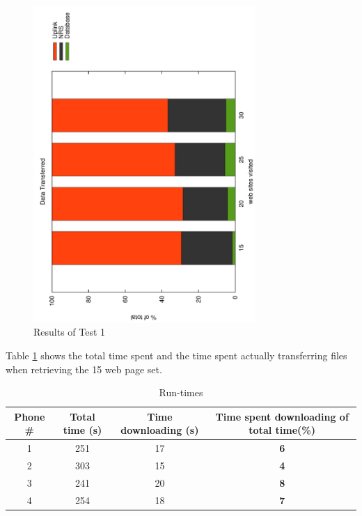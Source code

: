 \begin{figure}
	\centering
		\includegraphics[width=0.75\textwidth, angle=-90]{./img/plots.pdf}
    	\caption{Results of Test 1}
	\label{fig:frontendtest1}
\end{figure}

Table \ref{tbl:times} shows the total time spent and the time spent actually transferring files when retrieving the 15 web page set.

\begin{table}[!h]
		\centering
       \begin{tabular}{| c | c | c | c |}
               \hline
               Phone \# & Total time (s) & Time downloading (s) & Time spent downloading of total time(\%)\\
               \hline
               1 & 251 & 17 & \textbf{6}\\
               \hline
               2 & 303 & 15 & \textbf{4}\\
               \hline
               3 & 241 & 20 & \textbf{8}\\
               \hline
               4 & 254 & 18 & \textbf{7}\\
               \hline
       \end{tabular}
       \caption{Run-times}
       \label{tbl:times}
\end{table}

